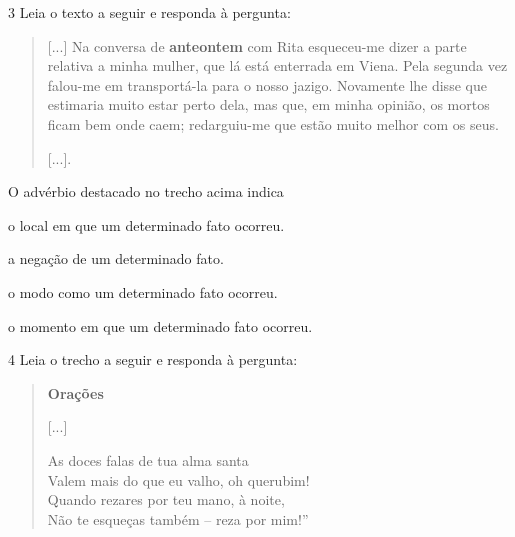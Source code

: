 \num{3} Leia o texto a seguir e responda à pergunta:

\begin{quote}
{[}...{]} Na conversa de \textbf{anteontem} com Rita esqueceu-me dizer
a parte relativa a minha mulher, que lá está enterrada em Viena. Pela
segunda vez falou-me em transportá-la para o nosso jazigo. Novamente lhe
disse que estimaria muito estar perto dela, mas que, em minha opinião,
os mortos ficam bem onde caem; redarguiu-me que estão muito melhor com
os seus.

{[}...{]}.

\end{quote}

O advérbio destacado no trecho acima indica

\begin{escolha}
\item o local em que um determinado fato ocorreu.

\item a negação de um determinado fato.

\item o modo como um determinado fato ocorreu.

\item o momento em que um determinado fato ocorreu.
\end{escolha}


\num{4} Leia o trecho a seguir e responda à pergunta:

\begin{quote}
\textbf{Orações}

{[}...{]}

As doces falas de tua alma santa\\
Valem mais do que eu valho, oh querubim!\\
Quando rezares por teu mano, à noite,\\
Não te esqueças também -- reza por mim!''

\end{quote}

